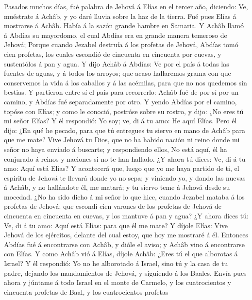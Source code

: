  Pasados muchos días, fué palabra de Jehová á Elías en el
tercer año, diciendo: Ve, muéstrate á Achâb, y yo daré lluvia sobre la
haz de la tierra.  Fué pues Elías á mostrarse á Achâb. Había
á la sazón grande hambre en Samaria.  Y Achâb llamó á Abdías
su mayordomo, el cual Abdías era en grande manera temeroso de Jehová;
 Porque cuando Jezabel destruía á los profetas de Jehová,
Abdías tomó cien profetas, los cuales escondió de cincuenta en cincuenta
por cuevas, y sustentólos á pan y agua.  Y dijo Achâb á
Abdías: Ve por el país á todas las fuentes de aguas, y á todos los
arroyos; que acaso hallaremos grama con que conservemos la vida á los
caballos y á las acémilas, para que no nos quedemos sin bestias.
 Y partieron entre sí el país para recorrerlo: Achâb fué de
por sí por un camino, y Abdías fué separadamente por otro. 
Y yendo Abdías por el camino, topóse con Elías; y como le conoció,
postróse sobre su rostro, y dijo: ¿No eres tú mi señor Elías?
 Y él respondió: Yo soy; ve, di á tu amo: He aquí Elías.
 Pero él dijo: ¿En qué he pecado, para que tú entregues tu
siervo en mano de Achâb para que me mate?  Vive Jehová tu
Dios, que no ha habido nación ni reino donde mi señor no haya enviado á
buscarte; y respondiendo ellos, No está aquí, él ha conjurado á reinos y
naciones si no te han hallado.  ¿Y ahora tú dices: Ve, di á
tu amo: Aquí está Elías?  Y acontecerá que, luego que yo me
haya partido de ti, el espíritu de Jehová te llevará donde yo no sepa; y
viniendo yo, y dando las nuevas á Achâb, y no hallándote él, me matará;
y tu siervo teme á Jehová desde su mocedad.  ¿No ha sido
dicho á mi señor lo que hice, cuando Jezabel mataba á los profetas de
Jehová: que escondí cien varones de los profetas de Jehová de cincuenta
en cincuenta en cuevas, y los mantuve á pan y agua?  ¿Y
ahora dices tú: Ve, di á tu amo: Aquí está Elías: para que él me mate?
 Y díjole Elías: Vive Jehová de los ejércitos, delante del
cual estoy, que hoy me mostraré á él.  Entonces Abdías fué
á encontrarse con Achâb, y dióle el aviso; y Achâb vino á encontrarse
con Elías.  Y como Achâb vió á Elías, díjole Achâb: ¿Eres
tú el que alborotas á Israel?  Y él respondió: Yo no he
alborotado á Israel, sino tú y la casa de tu padre, dejando los
mandamientos de Jehová, y siguiendo á los Baales.  Envía
pues ahora y júntame á todo Israel en el monte de Carmelo, y los
cuatrocientos y cincuenta profetas de Baal, y los cuatrocientos profetas
